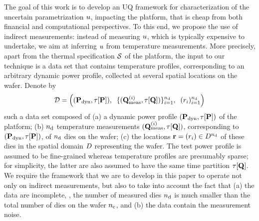 The goal of this work is to develop an UQ framework for characterization of the uncertain parametrization $u$, impacting the platform, that is cheap from both financial and computational perspectives. To this end, we propose the use of indirect measurements: instead of measuring $u$, which is typically expensive to undertake, we aim at inferring $u$ from temperature measurements. More precisely, apart from the thermal specification $\mathcal{S}$ of the platform, the input to our technique is a data set that contains temperature profiles, corresponding to an arbitrary dynamic power profile, collected at several spatial locations on the wafer. Denote by
\[
  \mathcal{D} = \left( (\mathbf{P}_{\text{dyn}}, \tau[\mathbf{P}]), \; \; \{ (\mathbf{Q}^{(i)}_{\text{meas}}, \tau[\mathbf{Q}]) \}_{i = 1}^{n_{\text{d}}}, \; \; ( r_i )_{i = 1}^{n_{\text{d}}} \right)
\]
such a data set composed of (a) a dynamic power profile $(\mathbf{P}_{\text{dyn}}, \tau[\mathbf{P}])$ of the platform; (b) ${n_{\text{d}}}$ temperature measurements $(\mathbf{Q}^{(i)}_{\text{meas}}, \tau[\mathbf{Q}])$, corresponding to $(\mathbf{P}_{\text{dyn}}, \tau[\mathbf{P}])$, of ${n_{\text{d}}}$ dies on the wafer; (c) the locations $\mathbf{r} = (r_i) \in D^{n_{\text{d}}}$ of these dies in the spatial domain $D$ representing the wafer. The test power profile is assumed to be fine-grained whereas temperature profiles are presumably sparse; for simplicity, the latter are also assumed to have the same time partition $\tau[\mathbf{Q}]$. We require the framework that we are to develop in this paper to operate not only on indirect measurements, but also to take into account the fact that (a) the data are incomplete, \ie, the number of measured dies ${n_{\text{d}}}$ is much smaller than the total number of dies on the wafer ${n_{\text{c}}}$, and (b) the data contain the measurement noise.
